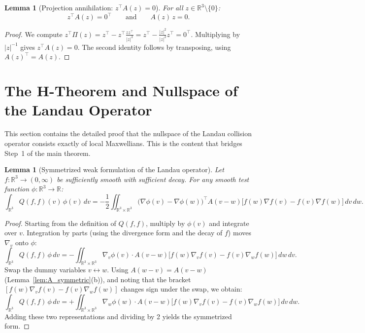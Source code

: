 \documentclass[11pt]{article}
\newcommand{\R}{\mathbb{R}}
\newtheorem{lemma}[theorem]{Lemma}
\begin{document}
\begin{lemma}[Projection annihilation: $z^\top A(z) = 0$]
\label{lem:zA_zero}
For all $z \in \R^3 \setminus \{0\}$:
\[
z^\top A(z) = 0^\top \qquad \text{and} \qquad A(z) \, z = 0.
\]
\end{lemma}

\begin{proof}
We compute $z^\top \Pi(z) = z^\top - z^\top \frac{z z^\top}{|z|^2} = z^\top - \frac{|z|^2}{|z|^2} z^\top = 0^\top$. Multiplying by $|z|^{-1}$ gives $z^\top A(z) = 0$. The second identity follows by transposing, using $A(z)^\top = A(z)$.
\end{proof}

\section{The H-Theorem and Nullspace of the Landau Operator}
\label{sec:htheorem}

This section contains the detailed proof that the nullspace of the Landau collision operator consists exactly of local Maxwellians. This is the content that bridges Step~1 of the main theorem.

\begin{lemma}[Symmetrized weak formulation of the Landau operator]
\label{lem:symmetrized_weak}
Let $f : \R^3 \to (0, \infty)$ be sufficiently smooth with sufficient decay. For any smooth test function $\phi : \R^3 \to \R$:
\[
\int_{\R^3} Q(f, f)(v) \, \phi(v) \, dv = -\frac{1}{2} \iint_{\R^3 \times \R^3} \big(\nabla \phi(v) - \nabla \phi(w)\big)^\top A(v - w) \big[f(w) \nabla f(v) - f(v) \nabla f(w)\big] \, dv \, dw.
\]
\end{lemma}

\begin{proof}
Starting from the definition of $Q(f,f)$, multiply by $\phi(v)$ and integrate over $v$. Integration by parts (using the divergence form and the decay of $f$) moves $\nabla_v$ onto $\phi$:
\[
\int_{\R^3} Q(f,f) \, \phi \, dv = -\iint_{\R^3 \times \R^3} \nabla_v \phi(v) \cdot A(v-w) \big[f(w) \nabla_v f(v) - f(v) \nabla_w f(w)\big] \, dw \, dv.
\]
Swap the dummy variables $v \leftrightarrow w$. Using $A(w-v) = A(v-w)$ (Lemma~\ref{lem:A_symmetric}(b)), and noting that the bracket $[f(w)\nabla_v f(v) - f(v)\nabla_w f(w)]$ changes sign under the swap, we obtain:
\[
\int_{\R^3} Q(f,f) \, \phi \, dv = +\iint_{\R^3 \times \R^3} \nabla_w \phi(w) \cdot A(v-w) \big[f(w) \nabla_v f(v) - f(v) \nabla_w f(w)\big] \, dv \, dw.
\]
Adding these two representations and dividing by 2 yields the symmetrized form.
\end{proof}
\end{document}
